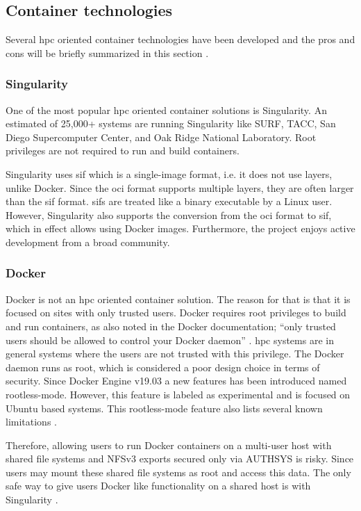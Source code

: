 \documentclass[conference]{IEEEtran}
\begin{document}
\subsection{Container technologies}
Several \gls{hpc} oriented container technologies have been developed and the pros and cons will be briefly summarized in this section \cite{hpc-workloads-justin, saha2018evaluation, stackhpc-state-of-hpc}.


\subsubsection{Singularity}
One of the most popular \gls{hpc} oriented container solutions is Singularity. An estimated of 25,000+ systems are running Singularity like SURF, TACC, San Diego Supercomputer Center, and Oak Ridge National Laboratory. Root privileges are not required to run and build containers.

Singularity uses \gls{sif} which is a single-image format, i.e. it does not use layers, unlike Docker. Since the \gls{oci} format supports multiple layers, they are often larger than the \gls{sif} format. \glspl{sif} are treated like a binary executable by a Linux user. However, Singularity also supports the conversion from the \gls{oci} format to \gls{sif}, which in effect allows using Docker images. Furthermore, the project enjoys active development from a broad community.


\subsubsection{Docker}
Docker is not an \gls{hpc} oriented container solution. The reason for that is that it is focused on sites with only trusted users. Docker requires root privileges to build and run containers, as also noted in the Docker documentation; ``only trusted users should be allowed to control your Docker daemon'' \cite{docker-security}. \gls{hpc} systems are in general systems where the users are not trusted with this privilege. The Docker daemon runs as root, which is considered a poor design choice in terms of security. Since Docker Engine v19.03 a new features has been introduced named rootless-mode. However, this feature is labeled as experimental and is focused on Ubuntu based systems. This rootless-mode feature also lists several known limitations \cite{docker-rootless}.

Therefore, allowing users to run Docker containers on a multi-user host with shared file systems and NFSv3 exports secured only via AUTHSYS is risky. Since users may mount these shared file systems as root and access this data. The only safe way to give users Docker like functionality on a shared host is with Singularity \cite{cloudy-hutch}.
\end{document}
